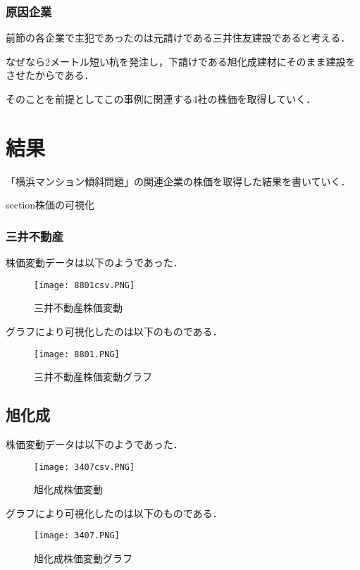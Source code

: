 {\subsection{原因企業}

前節の各企業で主犯であったのは元請けである三井住友建設であると考える．

なぜなら2メートル短い杭を発注し，下請けである旭化成建材にそのまま建設をさせたからである．

そのことを前提としてこの事例に関連する4社の株価を取得していく．

\chapter{結果}
「横浜マンション傾斜問題」の関連企業の株価を取得した結果を書いていく．


section{株価の可視化}
\subsection{三井不動産}

株価変動データは以下のようであった．


\begin{figure}[H]
\centering
\texttt{[image: 8801csv.PNG]}
\caption{三井不動産株価変動}\label{サンプル図}
\end{figure}


グラフにより可視化したのは以下のものである．




\begin{figure}[H]
\centering
\texttt{[image: 8801.PNG]}
\caption{三井不動産株価変動グラフ}\label{サンプル図}
\end{figure}




\section{旭化成}



株価変動データは以下のようであった．


\begin{figure}[H]
\centering
\texttt{[image: 3407csv.PNG]}
\caption{旭化成株価変動}\label{サンプル図}
\end{figure}


グラフにより可視化したのは以下のものである．




\begin{figure}[H]
\centering
\texttt{[image: 3407.PNG]}
\caption{旭化成株価変動グラフ}\label{サンプル図}
\end{figure}




}
